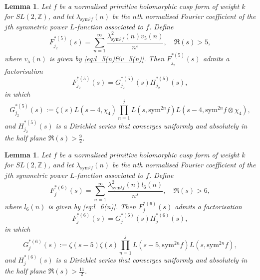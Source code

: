 \documentclass[10pt]{amsart}
\newtheorem{lemma}[theorem]{Lemma}
\begin{document}
\begin{lemma} \label{lem:F5*''}
Let $f$ be a normalised primitive holomorphic cusp form of weight $k$ for $SL(2,\mathbb{Z})$, and let $\lambda_{\mathrm{sym}^{j}f}(n)$ be the $n$th normalised Fourier coefficient of the $j$th symmetric power $L$-function associated to $f$. Define
\[
F_{j_2}^{*(5)}(s)=\sum_{n=1}^{\infty}\frac{\lambda_{\mathrm{sym}^{j}f}^{2}(n)v_5(n)}{n^{s}}, \quad \Re(s) > 5,
\]
where \(v_5(n)\) is given by \eqref{eq:l_5(n)&v_5(n)}. Then $F_{j_2}^{*(5)}(s)$ admits a factorisation
\[
F_{j_2}^{*(5)}(s)=G_{j_2}^{*(5)}(s)H_{j_2}^{*(5)}(s),
\]
in which
\[
G_{j_2}^{*(5)}(s):=\zeta(s)L(s-4,\chi_4)\prod_{n=1}^{j}L(s,\mathrm{sym}^{2n}f)L(s-4,\mathrm{sym}^{2n}f\otimes\chi_4),
\]
and $H_{j_2}^{*(5)}(s)$ is a Dirichlet series that converges uniformly and absolutely in the half plane $\Re(s)>\frac{9}{2}$.
\end{lemma}


\begin{lemma} \label{lem:F6*}
Let $f$ be a normalised primitive holomorphic cusp form of weight $k$ for $SL(2,\mathbb{Z})$, and let $\lambda_{\mathrm{sym}^{j}f}(n)$ be the $n$th normalised Fourier coefficient of the $j$th symmetric power $L$-function associated to $f$. Define
\[
F_{j}^{*(6)}(s)=\sum_{n=1}^{\infty}\frac{\lambda_{\mathrm{sym}^{j}f}^{2}(n)l_6(n)}{n^{s}}, \quad \Re(s) > 6,
\]
where \(l_6(n)\) is given by \eqref{eq:l_6(n)}. Then $F_{j}^{*(6)}(s)$ admits a factorisation
\[
F_{j}^{*(6)}(s)=G_{j}^{*(6)}(s)H_{j}^{*(6)}(s),
\]
in which
\[
G_{j}^{*(6)}(s):=\zeta(s-5)\zeta(s)\prod_{n=1}^{j}L(s-5,\mathrm{sym}^{2n}f)L(s,\mathrm{sym}^{2n}f),
\]
and $H_{j}^{*(6)}(s)$ is a Dirichlet series that converges uniformly and absolutely in the half plane $\Re(s)>\frac{11}{2}$. 
\end{lemma}
\end{document}
